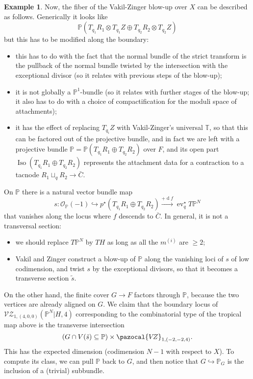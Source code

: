\documentclass[11pt]{amsart}
\newcommand{\PP}{\mathbb P}
\newcommand{\VZ}{\pazocal{V\!Z}}
\newcommand{\VZc}[4]{\mathcal{V\!Z}_{#1,#2}(#3,#4)}
\newcommand{\st}{\star}
\newcommand{\OO}{\mathcal{O}}
\renewcommand{\to}{\rightarrow}
\newcommand{\ev}{\operatorname{ev}}
\theoremstyle{definition}
\theoremstyle{definition}
\newtheorem{ex}[thm]{Example}
\begin{document}
\begin{ex}
 Now, the fiber of the Vakil-Zinger blow-up over $X$ can be described as follows. Generically it looks like \[\PP(T_{q_1}R_1\otimes T_{q_1}Z\oplus T_{q_2}R_2\otimes T_{q_2}Z)\]
 but this has to be modified along the boundary:
 \begin{itemize}
  \item this has to do with the fact that the normal bundle of the strict transform is the pullback of the normal bundle twisted by the intersection with the exceptional divisor (so it relates with previous steps of the blow-up);
  \item it is not globally a $\PP^1$-bundle (so it relates with further stages of the blow-up; it also has to do with a choice of compactification for the moduli space of attachments);
  \item it has the effect of replacing $T_{q_i}Z$ with Vakil-Zinger's universal $\mathbb T$, so that this can be factored out of the projective bundle, and in fact we are left with a projective bundle $\mathbb P=\PP(T_{q_1}R_1\oplus T_{q_2}R_2)$ over $F$, and its open part $\operatorname{Iso}(T_{q_1}R_1\oplus T_{q_2}R_2)$ represents the attachment data for a contraction to a tacnode $R_1\sqcup_q R_2\to\bar{C}$.
 \end{itemize}
On $\PP$ there is a natural vector bundle map \[s\colon \OO_{\PP}(-1)\hookrightarrow p^\st(T_{q_1}R_1\oplus T_{q_2}R_2)\xrightarrow{+\operatorname{d}f}\ev_q^\st T\PP^N\]
that vanishes along the locus where $f$ descends to $\bar C$. In general, it is not a transversal section:
\begin{itemize}
 \item we should replace $T\PP^N$ by $TH$ as long as all the $m^{(i)}$ are $\geq2$;
 \item Vakil and Zinger construct a blow-up of $\PP$ along the vanishing loci of $s$ of low codimension, and twist $s$ by the exceptional divisors, so that it becomes a transverse section $\tilde{s}$.
\end{itemize}
On the other hand, the finite cover $G\to F$ factors through $\PP$, because the two vertices are already aligned on $G$. We claim that the boundary locus of $\VZc{1}{(4,0,0)}{\PP^N|H}{4}$ corresponding to the combinatorial type of the tropical map above is the transverse intersection
\[\left(G\cap V(\tilde{s})\subseteq\PP\right)\times\VZ_{1,(-2,-2,4)}.\]
This has the expected dimension (codimension $N-1$ with respect to $X$). To compute its class, we can pull $\PP$ back to $G$, and then notice that $G\hookrightarrow\PP_G$ is the inclusion of a (trivial) subbundle.

\end{ex}
\end{document}
